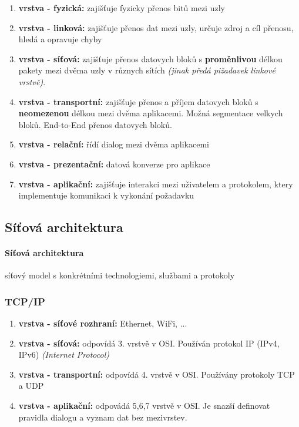 \documentclass[10pt,a4paper]{article}
\begin{document}
\begin{enumerate}
    \item \textbf{vrstva - fyzická:} zajišťuje fyzicky přenos bitů mezi uzly
    \item \textbf{vrstva - linková:} zajišťuje přenos dat mezi uzly, určuje zdroj a cíl přenosu, hledá a opravuje chyby
    \item \textbf{vrstva - síťová:} zajišťuje přenos datovych bloků s \textbf{proměnlivou} délkou pakety mezi dvěma uzly v různych sítích \textit{(jinak předá pižadavek linkové vrstvě)}.
    \item \textbf{vrstva - transportní:} zajišťuje přenos a příjem datovych bloků s \textbf{neomezenou} délkou mezi dvěma aplikacemi. Možná segmentace velkych bloků. End-to-End přenos datovych bloků.
    \item \textbf{vrstva - relační:} řídí dialog mezi dvěma aplikacemi
    \item \textbf{vrstva - prezentační:} datová konverze pro aplikace
    \item \textbf{vrstva - aplikační:} zajišťuje interakci mezi uživatelem a protokolem, ktery implementuje komunikaci k vykonání požadavku
\end{enumerate}

\subsection{Síťová architektura}

\paragraph{Síťová architektura} síťový model s konkrétními technologiemi, službami a protokoly

\subsubsection{TCP/IP} 

\begin{enumerate}
    \item \textbf{vrstva - síťové rozhraní:} Ethernet, WiFi, ...
    \item \textbf{vrstva - síťová:} odpovídá 3. vrstvě v OSI. Používán protokol IP (IPv4, IPv6) \textit{(Internet Protocol)}
    \item \textbf{vrstva - transportní:} odpovídá 4. vrstvě v OSI. Používány protokoly TCP a UDP
    \item \textbf{vrstva - aplikační:} odpovádá 5,6,7 vrstvě v OSI. Je snazší definovat pravidla dialogu a vyznam dat bez mezivrstev.
\end{enumerate}
\end{document}
